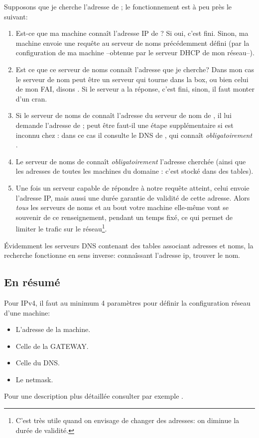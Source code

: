 Supposons que je cherche l'adresse de ; le
fonctionnement est à peu près le suivant: 
\begin{enumerate}
  \item Est-ce que ma machine connaît l'adresse IP de
    ? Si oui, c'est fini. Sinon, ma machine envoie une
    requête au serveur de noms précédemment défini (par la
    configuration de ma machine --obtenue par le serveur DHCP de mon réseau--).
  \item Est ce que ce serveur de noms connaît l'adresse que je cherche?
    Dans mon cas le serveur de nom peut être un serveur qui tourne
    dans la box, ou bien  celui de mon FAI, disons
    . Si le serveur a la réponse, c'est fini, sinon, il
    faut monter d'un cran.
  \item Si le serveur de noms de  connaît l'adresse du
    serveur de nom de , il lui demande l'adresse de
    ; peut être faut-il une étape
    supplémentaire si   est inconnu chez
    : dans ce cas il consulte le DNS de , qui
    connaît \emph{obligatoirement} .
  \item  Le serveur de noms de  connaît
    \emph{obligatoirement} l'adresse cherchée (ainsi que les adresses de
    toutes les machines du domaine : c'est stocké
    dans des tables).
  \item Une fois un serveur capable de répondre à notre requête
    atteint, celui envoie l'adresse IP, mais aussi une durée garantie
    de validité de cette adresse. Alors \emph{tous} les serveurs de noms
    et au bout votre machine elle-même vont se souvenir de ce
    renseignement, pendant un temps fixé, ce
    qui  permet de limiter le trafic sur le réseau\footnote{C'est très
      utile quand on envisage de changer des adresses: on diminue la
      durée de validité.}.
    
\end{enumerate}
Évidemment les serveurs DNS contenant des tables associant adresses
et noms, la recherche fonctionne en sens inverse: connaîssant l'adresse
ip, trouver le nom. 
\subsection{En résumé}
Pour IPv4, il faut au minimum  4 paramètres pour définir la
configuration réseau d'une machine:
\begin{itemize}
\item L'adresse de la machine.
\item Celle de la GATEWAY.
\item Celle du DNS.
\item Le netmask.
\end{itemize}
Pour une description plus détaillée consulter par exemple \cite{dns}.

